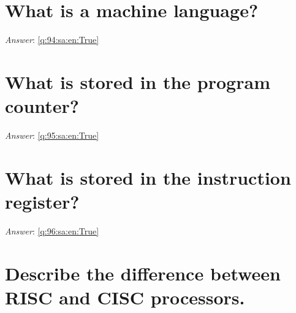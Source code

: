 \documentclass[a4paper,11pt,oneside]{book}
\begin{document}
\begin{sloppypar}
\section{What is a machine language?}

\label{q:94:sa:en:False}

\vspace{2cm}

\noindent\makebox[\textwidth]{\hrulefill}

\vspace{1cm}

\textit{Answer}: \autoref{q:94:sa:en:True}



\section{What is stored in the program counter?}

\label{q:95:sa:en:False}

\vspace{2cm}

\noindent\makebox[\textwidth]{\hrulefill}

\vspace{1cm}

\textit{Answer}: \autoref{q:95:sa:en:True}



\section{What is stored in the instruction register?}

\label{q:96:sa:en:False}

\vspace{2cm}

\noindent\makebox[\textwidth]{\hrulefill}

\vspace{1cm}

\textit{Answer}: \autoref{q:96:sa:en:True}



\section{Describe the difference between RISC and CISC processors.}

\label{q:97:sa:en:False}

\vspace{2cm}

\noindent\makebox[\textwidth]{\hrulefill}


\end{sloppypar}
\end{document}
